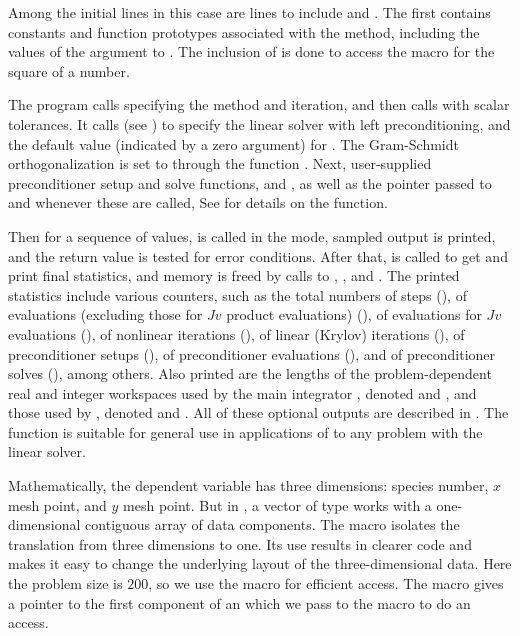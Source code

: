 Among the initial  lines in this case are lines to
include  and .  The first contains
constants and function prototypes associated with the {\spgmr} method,
including the values of the  argument to .
The inclusion of  is done to access the 
macro for the square of a  number.

The  program calls  specifying the  method
and  iteration, and then calls  with scalar
tolerances.   
It calls   (see ) to specify the {\cvspgmr} 
linear solver with left preconditioning, and the default value (indicated by a zero argument)
for .  The Gram-Schmidt orthogonalization is set to 
through the function .  Next, user-supplied preconditioner
setup and solve functions,  and , as well as the 
 pointer passed to  and  whenever these are called,
See  for details on the  function.

Then for a sequence of  values,  is called in the
 mode, sampled output is printed, and the return value is
tested for error conditions.  After that,  is called
to get and print final statistics, and memory is freed by calls to
, , and .  The printed
statistics include various counters, such as the total numbers of steps
(), of  evaluations (excluding those for $Jv$ product
evaluations) (), of  evaluations for $Jv$ evaluations (),
of nonlinear iterations (), of linear (Krylov) iterations (),
of preconditioner setups (), of preconditioner evaluations
(), and of preconditioner solves (), among others.  
Also printed are the lengths of the problem-dependent real and integer
workspaces used by the main integrator , denoted  and
, and those used by {\cvspgmr}, denoted  and .
All of these optional outputs are described in .
The  function is suitable for general use in applications
of {\cvode} to any problem with the {\spgmr} linear solver.

Mathematically, the dependent variable has three dimensions: species
number, $x$ mesh point, and $y$ mesh point.  But in {\nvecs}, a vector of
type  works with a one-dimensional contiguous array of
data components. The macro  isolates the translation from
three dimensions to one. Its use results in clearer code and makes it
easy to change the underlying layout of the three-dimensional data. 
Here the problem size is $200$, so we use the  macro
for efficient  access.  The  macro gives
a pointer to the first component of an  which we pass to
the  macro to do an  access.

